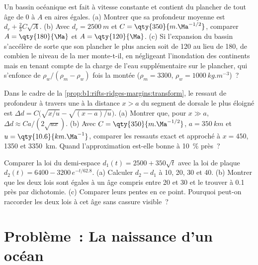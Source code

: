 \begin{exercise}[$\star\star\star$]\label{exo:b1:rifts-ridges-margins:10}
Un bassin océanique est fait à vitesse constante et contient du plancher de tout âge de 0
à $A$ en aires égales. (a) Montrer que sa profondeur moyenne est $d_r +
\frac23C\sqrt A$. (b) Avec $d_r = \qty{2500}{m}$ et
$C = \qty{350}{m.\Ma^{-1/2}}$, comparer $A = \qty{180}{\Ma}$ et
$A = \qty{120}{\Ma}$. (c) Si l'expansion du bassin s'accélère de sorte que son
plancher le plus ancien soit de \qty{120}{\Ma} au lieu de \qty{180}{\Ma}, de combien
le niveau de la mer monte-t-il, en négligeant l'inondation des continents mais en tenant compte de la
charge de l'eau supplémentaire sur le plancher, qui s'enfonce de $\rho_w/(\rho_m - \rho_w)$
fois la montée ($\rho_m = 3300$, $\rho_w = \qty{1000}{kg.m^{-3}}$)~?
\end{exercise}

\begin{exercise}[$\star\star\star$]\label{exo:b1:rifts-ridges-margins:11}
Dans le cadre de la \cref{prop:b1:rifts-ridges-margins:transform}, le ressaut de profondeur
à travers une  à la distance $x > a$ du segment de dorsale le plus éloigné
est $\Delta d = C\bigl(\sqrt{x/u} - \sqrt{(x - a)/u}\bigr)$. (a) Montrer que, pour
$x \gg a$, $\Delta d \approx Ca/(2\sqrt{ux})$. (b) Avec
$C = \qty{350}{m.\Ma^{-1/2}}$, $a = \qty{350}{km}$ et
$u = \qty{10.6}{km.\Ma^{-1}}$, comparer les ressauts exact et approché à
$x = 450$, 1350 et \qty{3350}{km}. Quand l'approximation est-elle bonne à
\qty{10}{\percent} près~?
\end{exercise}

\begin{exercise}[$\star\star\star$]\label{exo:b1:rifts-ridges-margins:12}
Comparer la loi du demi-espace $d_1(t) = 2500 + 350\sqrt t$ avec la loi de plaque
$d_2(t) = 6400 - 3200\,e^{-t/62.8}$. (a) Calculer $d_2 - d_1$ à 10, 20, 30 et
\qty{40}{\Ma}. (b) Montrer que les deux lois sont égales à un âge compris entre 20 et
\qty{30}{\Ma} et le trouver à \qty{0.1}{\Ma} près par dichotomie. (c) Comparer leurs
pentes en ce point. Pourquoi peut-on raccorder les deux lois à cet âge sans cassure
visible~?
\end{exercise}

\section{Problème~: La naissance d'un océan}

